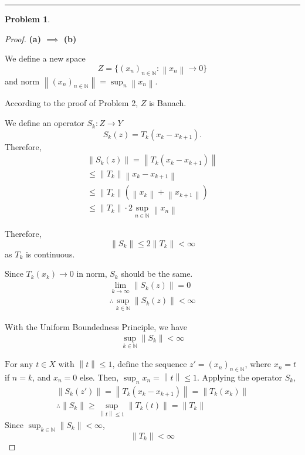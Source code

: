 \documentclass{article}
\newcommand{\norm}[1]{\left\|#1\right\|}
\newcommand{\N}{\mathbb{N}}
\newtheorem{problem}{Problem}
\begin{document}
\hrule
\vspace{0.5em}


\begin{problem}
\end{problem}

\begin{proof}

\textbf{(a) $\implies$ (b)}

We define a new space 
$$
Z = \{ (x_n)_{n \in \N} : \norm{x_n} \rightarrow 0 \}
$$
and norm $ \norm{(x_n)_{n \in \N}} = \sup_{n} \norm{x_n} $.

According to the proof of Problem 2, $Z$ is Banach.

We define an operator $S_k: Z \rightarrow Y$
$$
S_k(z) = T_k(x_k - x_{k+1}).
$$
Therefore,
\begin{gather}
\norm{S_k(z)} = \norm{T_k(x_k - x_{k+1})} 
\\
\leq \norm{T_k} \norm{x_k - x_{k+1}} 
\\
\leq \norm{T_k} (\norm{x_k} + \norm{x_{k+1}})
\\
\leq \norm{T_k} \cdot 2 \sup_{n \in \N} \norm{x_n}
\end{gather}

Therefore, 
$$
\norm{S_k}  \leq 2 \norm{T_k} < \infty
$$
as $T_k$ is continuous.

Since $T_k(x_k) \rightarrow 0$ in norm, $S_k$ should be the same.
\begin{gather}
\lim_{k \to \infty} \norm{S_k(z)} = 0
\\
\therefore \sup_{k \in \N} \norm{S_k(z)} < \infty
\end{gather}

With the Uniform Boundedness Principle, we have
\begin{gather}
    \sup_{k \in \N} \norm{S_k} < \infty
\end{gather}


$
\text{For any } t \in X \text{ with }  \norm{t} \le 1 \text{, define the sequence } 
z' = (x_n)_{n \in \N}
$,  where $x_n = t$ if $n=k$, and $x_n = 0$ else.
Then,
$
\sup_{n} x_n = \norm{t} \le 1.
$
Applying the operator $S_k$,
\begin{gather}
    \norm{S_k(z')} = \norm{T_k(x_k - x_{k+1})} = \norm{T_k(x_k)} 
    \\
    \therefore \norm{S_k} \geq \sup_{\norm{t} \leq 1} \norm{T_k(t)} = \norm{T_k}
\end{gather}
Since $\sup_{k \in \N} \norm{S_k} < \infty$,
$$
\norm{T_k} < \infty
$$


\end{proof}
\end{document}
